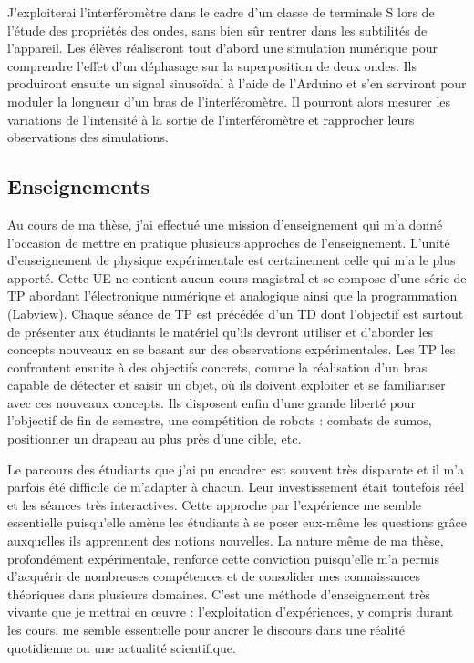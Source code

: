 \documentclass[12pt,a4paper]{article}
\begin{document}
J'exploiterai l'interféromètre dans le cadre d'un classe de terminale S lors de l'étude des propriétés des ondes, sans bien sûr rentrer dans les subtilités de l'appareil.
Les élèves réaliseront tout d'abord une simulation numérique pour comprendre l'effet d'un déphasage sur la superposition de deux ondes.
Ils produiront ensuite un signal sinusoïdal à l'aide de l'Arduino et s'en serviront pour moduler la longueur d'un bras de l'interféromètre.
Il pourront alors mesurer les variations de l'intensité à la sortie de l'interféromètre et rapprocher leurs observations des simulations. 

\subsection{Enseignements}

Au cours de ma thèse, j'ai effectué une mission d'enseignement qui m'a donné l'occasion de mettre en pratique plusieurs approches de l'enseignement.
L'unité d'enseignement de physique expérimentale est certainement celle qui m'a le plus apporté.
Cette UE ne contient aucun cours magistral et se compose d'une série de TP abordant l'électronique numérique et analogique ainsi que la programmation (Labview).
Chaque séance de TP est précédée d'un TD dont l'objectif est surtout de présenter aux étudiants le matériel qu'ils devront utiliser et d'aborder les concepts nouveaux en se basant sur des observations expérimentales.
Les TP les confrontent ensuite à des objectifs concrets, comme la réalisation d'un bras capable de détecter et saisir un objet, où ils doivent exploiter et se familiariser avec ces nouveaux concepts.
Ils disposent enfin d'une grande liberté pour l'objectif de fin de semestre, une compétition de robots : combats de \og sumos\fg{}, positionner un drapeau au plus près d'une cible, etc.

Le parcours des étudiants que j'ai pu encadrer est souvent très disparate et il m'a parfois été difficile de m'adapter à chacun.
Leur investissement était toutefois réel et les séances très interactives.
Cette approche par l'expérience me semble essentielle puisqu'elle amène les étudiants à se poser eux-même les questions grâce auxquelles ils apprennent des notions nouvelles.
La nature même de ma thèse, profondément expérimentale, renforce cette conviction puisqu'elle m'a permis d'acquérir de nombreuses compétences et de consolider mes connaissances théoriques dans plusieurs domaines.
C'est une méthode d'enseignement très vivante que je mettrai en œuvre : l'exploitation d'expériences, y compris durant les cours, me semble essentielle pour ancrer le discours dans une réalité quotidienne ou une actualité scientifique.
\end{document}
